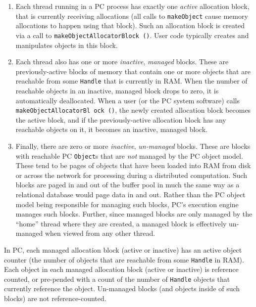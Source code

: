 \begin{enumerate}

\item Each thread running in a PC process has exactly one \emph{active} allocation block, that is currently receiving allocations (all calls to
\texttt{makeObject} cause memory allocations to happen using that block).  Such an allocation block is created via a call to 
\texttt{makeObjectAllocatorBlock ()}.  User code typically creates and manipulates objects in this block.

\item Each thread also has one or more
\emph{inactive}, \emph{managed} blocks.  These are previously-active blocks of memory that contain one or more objects that are reachable
from some \texttt{Handle} that is currently in RAM.  When the number of reachable objects in an inactive, managed block drops to zero, it is automatically
deallocated.
When a user (or the PC system software) calls 
\texttt{makeObjectAllocatorBl ock ()}, the newly created allocation block becomes the active block, and if the previously-active allocation block has any
reachable objects on it, it becomes an inactive, managed block.

\item Finally, there are zero or more \emph{inactive},
  \emph{un-managed} blocks.  These are blocks with reachable PC
  \texttt{Object}s that are \emph{not} managed by the PC object model.  These tend to be pages of objects that have
been loaded into RAM from disk or across the network for processing
during a distributed computation.  Such blocks are paged in and out of the
buffer pool in much the same way as a relational database would page data in and out.
Rather than the PC object model being responsible for managing such blocks, PC's execution engine manages such blocks.
Further, since managed blocks are only managed by the ``home'' thread where
they are created, a managed block is effectively un-managed when viewed from
any other thread.

\end{enumerate}

In PC, each managed allocation block (active or inactive) has an active object counter (the number of objects that are reachable
from some \texttt{Handle} in RAM).  Each object in each managed allocation block (active or inactive) is reference counted, or pre-pended with a count of
the number of \texttt{Handle} objects that currently reference the object.  
Un-managed blocks (and objects inside of such blocks) are not reference-counted.

